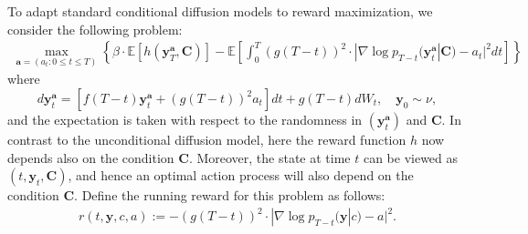 \documentclass[11pt]{article}
\begin{document}
To adapt standard conditional diffusion models to reward maximization, we consider the following problem:
\begin{align}\label{eq:CT-RL-y}
 \max_{{\mathbf{a}} = (a_t: 0 \le t \le T)} \left\{ \beta \cdot \mathbb{E}[h( \mathbf{y}^{\mathbf{a}}_{T}, \mathbf{C})] -  \mathbb{E} \left[ \int_0^T (g(T-t))^{2} \cdot {| \nabla\log p_{T-t}({\mathbf{y}}^{\mathbf{a}}_{t} | \mathbf{C} ) - a_t|^2} dt \right]  \right\}
\end{align}
where
\begin{equation}\label{eq:u-sys-con}
d\mathbf{y}^{\mathbf{a}}_{t}=\left[f(T-t)\mathbf{y}^{\mathbf{a}}_{t}+(g(T-t))^{2} a_t \right]dt
+g(T-t)d W_{t}, \quad \mathbf{y}_{0}\sim\nu,
\end{equation}
and the expectation is taken with respect to the randomness in $(\mathbf{y}^{\mathbf{a}}_{t})$ and $\mathbf{C}$. In contrast to the unconditional diffusion model, here the reward function $h$ now depends also on the condition $\mathbf{C}$. Moreover, the state at time $t$ can be viewed as $(t, \mathbf{y}_{t}, \mathbf{C})$, and hence an optimal action process will also depend on the condition $\mathbf{C}.$
Define the running reward for this problem as follows:
\begin{align}\label{eq:rt-y}
 r(t, \mathbf{y}, c, a) := -(g(T-t))^{2} \cdot {| \nabla\log p_{T-t}({\mathbf{y}}|c) - a|^2}.
\end{align}
\end{document}
